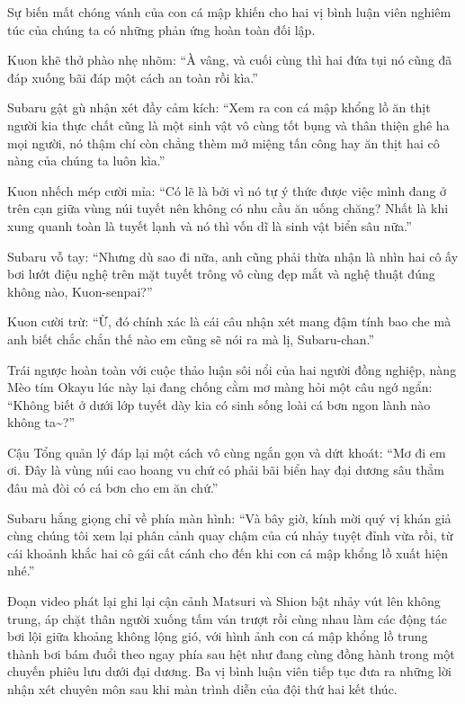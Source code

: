 \documentclass[../main.tex]{subfiles}
\begin{document}
Sự biến mất chóng vánh của con cá mập khiến cho hai vị bình luận viên nghiêm túc của chúng ta có những phản ứng hoàn toàn đối lập.

Kuon khẽ thở phào nhẹ nhõm: ``À vâng, và cuối cùng thì hai đứa tụi nó cũng đã đáp xuống bãi đáp một cách an toàn rồi kìa.''

Subaru gật gù nhận xét đầy cảm kích: ``Xem ra con cá mập khổng lồ ăn thịt người kia thực chất cũng là một sinh vật vô cùng tốt bụng và thân thiện ghê ha mọi người, nó thậm chí còn chẳng thèm mở miệng tấn công hay ăn thịt hai cô nàng của chúng ta luôn kìa.''

Kuon nhếch mép cười mỉa: ``Có lẽ là bởi vì nó tự ý thức được việc mình đang ở trên cạn giữa vùng núi tuyết nên không có nhu cầu ăn uống chăng? Nhất là khi xung quanh toàn là tuyết lạnh và nó thì vốn dĩ là sinh vật biển sâu nữa.''

Subaru vỗ tay: ``Nhưng dù sao đi nữa, anh cũng phải thừa nhận là nhìn hai cô ấy bơi lướt điệu nghệ trên mặt tuyết trông vô cùng đẹp mắt và nghệ thuật đúng không nào, Kuon-senpai?''

Kuon cười trừ: ``Ừ, đó chính xác là cái câu nhận xét mang đậm tính bao che mà anh biết chắc chắn thế nào em cũng sẽ nói ra mà lị, Subaru-chan.''

Trái ngược hoàn toàn với cuộc thảo luận sôi nổi của hai người đồng nghiệp, nàng Mèo tím Okayu lúc này lại đang chống cằm mơ màng hỏi một câu ngớ ngẩn: ``Không biết ở dưới lớp tuyết dày kia có sinh sống loài cá bơn ngon lành nào không ta\~{}?''

Cậu Tổng quản lý đáp lại một cách vô cùng ngắn gọn và dứt khoát: ``Mơ đi em ơi. Đây là vùng núi cao hoang vu chứ có phải bãi biển hay đại dương sâu thẳm đâu mà đòi có cá bơn cho em ăn chứ.''

Subaru hắng giọng chỉ về phía màn hình: ``Và bây giờ, kính mời quý vị khán giả cùng chúng tôi xem lại phân cảnh quay chậm của cú nhảy tuyệt đỉnh vừa rồi, từ cái khoảnh khắc hai cô gái cất cánh cho đến khi con cá mập khổng lồ xuất hiện nhé.''

Đoạn video phát lại ghi lại cận cảnh Matsuri và Shion bật nhảy vút lên không trung, áp chặt thân người xuống tấm ván trượt rồi cùng nhau làm các động tác bơi lội giữa khoảng không lộng gió, với hình ảnh con cá mập khổng lồ trung thành bơi bám đuổi theo ngay phía sau hệt như đang cùng đồng hành trong một chuyến phiêu lưu dưới đại dương. Ba vị bình luận viên tiếp tục đưa ra những lời nhận xét chuyên môn sau khi màn trình diễn của đội thứ hai kết thúc.
\end{document}
